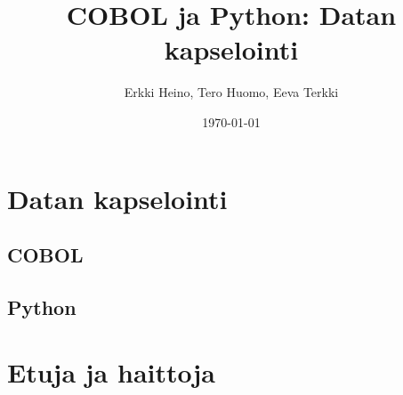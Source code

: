 \documentclass{tktltiki}
\begin{document}
\onehalfspacing

\title{COBOL ja Python: Datan kapselointi}
\author{Erkki Heino, Tero Huomo, Eeva Terkki}
\date{\today}

\maketitle


\mytableofcontents

\section{Datan kapselointi}

\subsection{COBOL}



\subsection{Python}



\section{Etuja ja haittoja}


\newpage
 



\lastpage

\appendices

\pagestyle{empty}

\end{document}
